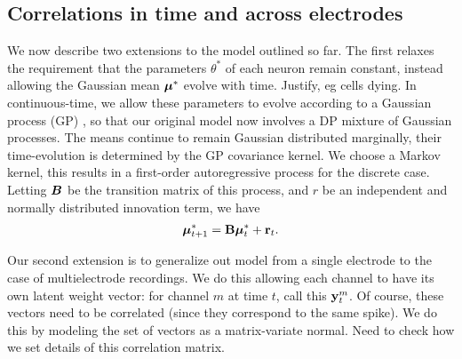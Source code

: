 \subsection{Correlations in time and across electrodes}
We now describe two extensions to the model outlined so far. 
The first relaxes the requirement that the parameters $\theta^*$ of each neuron remain constant, instead allowing the Gaussian mean $\boldsymbol{\mu}^*$ evolve
with time.  {\color{green} Justify, eg cells dying}. 
In continuous-time, we allow these parameters to evolve according to a Gaussian process (GP) \citep{}, so that our original model now involves a DP mixture 
of Gaussian processes. The means continue to remain Gaussian distributed marginally, their time-evolution is determined by the GP covariance kernel.
We choose a Markov kernel, this results in a first-order autoregressive process for the discrete case. Letting $\boldsymbol{B}$ be the transition matrix of this
process, 
and $r$ be an independent and normally distributed innovation term, we have
\begin{align}
  \boldsymbol{\mu}^*_{t+1} = \mathbf{B} \boldsymbol{\mu}^*_t + \mathbf{r}_t.
\end{align}

Our second extension is to generalize out model from a single electrode to the case of multielectrode recordings. 
We do this allowing each channel to have its own latent weight vector: for channel $m$ at time $t$, call this $\mathbf{y}^m_t$.
Of course, these vectors need to be correlated (since they correspond to the same spike). We do this by modeling the set of
vectors as a matrix-variate normal.
{\color{green} Need to check how we set details of this correlation matrix}.

